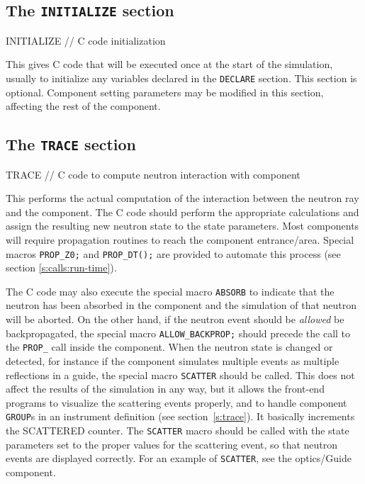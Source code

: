\subsection{The \texttt{INITIALIZE} section}
\label{s:comp-initialize}

\begin{mcstas}
INITIALIZE
// C code initialization 
\end{mcstas}
 This gives C code that will be executed once at the
start of the simulation, usually to initialize any variables declared in the
\texttt{DECLARE} section. This section is optional. Component setting parameters
may be modified in this section, affecting the rest of the component.


\subsection{The \texttt{TRACE} section}
\label{s:comp-trace}

\begin{mcstas}
TRACE
// C code to compute neutron interaction with component
\end{mcstas}
This performs the actual computation of the interaction between the
neutron ray and the component. The C code should perform the appropriate
calculations and assign the resulting new neutron state to the state
parameters. Most components will require propagation routines to reach the component entrance/area. Special macros \verb+PROP_Z0;+ and \verb+PROP_DT();+ are provided to automate this process (see section \ref{s:calls:run-time}).

The C code may also execute the special macro \texttt{ABSORB} to indicate
that the neutron has been absorbed in the component and the simulation of
that neutron will be aborted.
On the other hand, if the neutron event
should be \emph{allowed} be backpropagated, the special macro
\verb+ALLOW_BACKPROP;+ should precede the call to the \verb+PROP_+
call inside the component.
When the neutron state is changed or detected, for
instance if the component simulates multiple events as multiple
reflections in a guide, the
special macro \texttt{SCATTER}
should be called. This does not affect the
results of the simulation in any way, but it allows the front-end
programs to visualize the scattering events properly, and to handle
component \texttt{GROUP}s in an instrument definition (see
section~\ref{s:trace}). It basically increments the SCATTERED counter.
The \texttt{SCATTER} macro should be called with
the state parameters set to the proper values for the scattering event, so that neutron events are displayed correctly.
For an example of \texttt{SCATTER}, see the optics/Guide
component.


